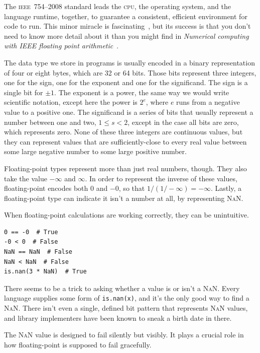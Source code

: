 \documentclass[fleqn,10pt]{olplainarticle}
\newcommand{\cpu}{\textsc{cpu}\xspace}
\newcommand{\nan}{\textsc{NaN}\xspace}
\newcommand{\ieee}{\textsc{ieee}\xspace}
\begin{document}
The \ieee~754--2008 standard leads the \cpu, the operating system, and 
the language runtime, together, to guarantee a consistent, efficient environment
for code to run. This minor miracle is fascinating~\citep{muller2018handbook},
but its success is that you don't need to know more detail about it than
you might find in \emph{Numerical computing with IEEE floating point arithmetic}~\citep{overton2001numerical,goldberg1991every}.

The data type we store in programs is usually encoded in a binary representation
of four or eight bytes, which are 32 or 64 bits. Those bits represent three integers,
one for the sign, one for the exponent and one for the significand. The sign is
a single bit for $\pm 1$. The exponent is a power, the same way we would write
scientific notation, except here the power is $2^e$, where $e$ runs from a
negative value to a positive one. The significand is a series of bits that
usually represent a number between one and two, $1 \le s < 2$, except in the
case all bits are zero, which represents zero. None of these three
integers are continuous values, but they can represent values that are
sufficiently-close to every real value between some large negative number
to some large positive number.

Floating-point types represent more than just real numbers, though. They
also take the value $-\infty$ and $\infty$. In order to represent the inverse
of these values, floating-point encodes both $0$ and $-0$, so that $1/(1 / -\infty)=-\infty$.
Lastly, a floating-point type can indicate it isn't a number at all,
by representing \nan.

When floating-point calculations are working correctly, they can
be unintuitive.

\begin{lstlisting}
0 == -0  # True
-0 < 0  # False
NaN == NaN  # False
NaN < NaN  # False
is.nan(3 * NaN)  # True
\end{lstlisting}

There seems to be a trick to asking whether a value is
or isn't a \nan. Every language supplies some form of \lstinline|is.nan(x)|,
and it's the only good way to find a \nan. There isn't even a single,
defined bit pattern that represents \nan values, and library implementers
have been known to sneak a birth date in there.

The \nan value is designed to fail silently but visibly. It plays
a crucial role in how floating-point is supposed to fail gracefully.
\end{document}
